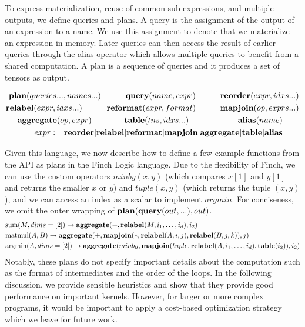 To express materialization, reuse of common sub-expressions, and multiple outputs, we define queries and plans. A query is the assignment of the output of an expression to a name. We use this assignment to denote that we materialize an expression in memory. Later queries can then access the result of earlier queries through the alias operator which allows multiple queries to benefit from a shared computation. A plan is a sequence of queries and it produces a set of tensors as output. 

\begin{align*}
    \text{\textbf{plan}}(queries..., names...) \quad\quad\quad \text{\textbf{query}}(name, expr) \quad\quad\quad \text{\textbf{reorder}}(expr, idxs...)\\
     \text{\textbf{relabel}}(expr, idxs...) \quad\quad\quad \text{\textbf{reformat}}(expr, format) \quad\quad\quad \text{\textbf{mapjoin}}(op, exprs...) \\
    \text{\textbf{aggregate}}(op, expr)\quad\quad\quad\quad \text{\textbf{table}}(tns, idxs...)  \quad\quad\quad\quad\quad\quad \text{\textbf{alias}}(name) \quad\quad\\
     expr:= \text{\textbf{reorder}} | \text{\textbf{relabel}} | \text{\textbf{reformat}} |\text{\textbf{mapjoin}} | \text{\textbf{aggregate}} | \text{\textbf{table}} | \text{\textbf{alias}} \quad\quad
\end{align*}

Given this language, we now describe how to define a few example functions from the API as plans in the Finch Logic language. Due to the flexibility of Finch, we can use the custom operators $minby(x,y)$ (which compares $x[1]$ and $y[1]$ and returns the smaller $x$ or $y$) and $tuple(x, y)$ (which returns the tuple $(x,y)$), and we can access an index as a scalar to implement $argmin$. For conciseness, we omit the outer wrapping of $\text{\textbf{plan}}(\text{\textbf{query}}(out,...),out)$.
\begin{align*}
&\text{sum}(M, dims=[2]) \rightarrow \text{\textbf{aggregate}}(+,\text{\textbf{relabel}}(M, i_1,\ldots,i_d), i_2)\\
&\text{matmul}(A, B) \rightarrow \text{\textbf{aggregate}}(+,\text{\textbf{mapjoin}}(*, \text{\textbf{relabel}}(A, i, j), \text{\textbf{relabel}}(B, j, k)), j)\\
&\text{argmin}(A, dims=[2]) \rightarrow \text{\textbf{aggregate}}(minby,\text{\textbf{mapjoin}}(tuple, \text{\textbf{relabel}}(A, i_1,\ldots,i_d), \text{\textbf{table}}(i_2)), i_2)
\end{align*}
Notably, these plans do not specify important details about the computation such as the format of intermediates and the order of the loops. In the following discussion, we provide sensible heuristics and show that they provide good performance on important kernels. However, for larger or more complex programs, it would be important to apply a cost-based optimization strategy which we leave for future work.


